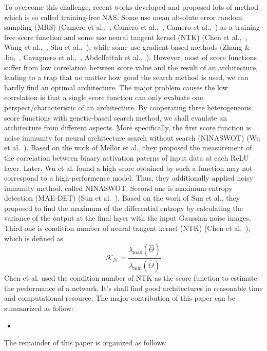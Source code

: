\documentclass[conference]{IEEEtran}
\begin{document}
    To overcome this challenge, recent works developed and proposed lots 
    of method which is so called training-free NAS. Some use mean absolute 
    error random sampling (MRS) (Camero et al.,\ \cite{https://doi.org/10.48550/arxiv.1805.07159}, 
    Camero et al.,\ \cite{Camero_2021}, Camero et al.,\ \cite{https://doi.org/10.48550/arxiv.2106.15295}) 
    as a training-free score function and some use neural tangent kernel 
    (NTK) (Chen et al.,\ \cite{https://doi.org/10.48550/arxiv.2102.11535}, 
    Wang et al.,\ \cite{https://doi.org/10.48550/arxiv.2203.09137}, 
    Shu et al.,\ \cite{https://doi.org/10.48550/arxiv.2109.00817}), while some use 
    gradient-based methods (Zhang \& Jia,\ \cite{https://doi.org/10.48550/arxiv.2110.08616}, 
    Cavagnero et al.,\ \cite{https://doi.org/10.48550/arxiv.2207.05135}, 
    Abdelfattah et al.,\ \cite{https://doi.org/10.48550/arxiv.2101.08134}).
    However, most of score functions suffer from low correlation between 
    score value and the result of an architecture, leading to a trap that 
    no matter how good the search method is used, we can hardly find an 
    optimal architecture.
    The major problem causes the low correlation is that a single score 
    function can only evaluate one perspect/characteristic of an architecture.
    By cooperating three heterogeneous score functions with genetic-based 
    search method, we shall evaulate an architecture from different aspects. 
    More specifically, the first score function is noise immunity for neural 
    architecture search without search (NINASWOT) (Wu et al.\ \cite{10.1145/3491396.3506510}). 
    Based on the work of Mellor et al., they proposed the measurement of 
    the correlation between binary activation paterns of input data at each 
    ReLU layer. Later, Wu et al. found a high score obtained by such a 
    function may not correspond to a high-performence model. Thus, they 
    additionally applied noisy immunity method, called NINASWOT. Second one 
    is maximum-entropy detection (MAE-DET) (Sun et al.\ \cite{https://doi.org/10.48550/arxiv.2111.13336}). 
    Based on the work of Sun et al., they proposed to find the maximum of 
    the differential entropy by calculating the variance of the output at 
    the final layer with the input Gaussian noise images. Third one is 
    condition number of  neural tangent kernel (NTK) (Chen et al.\ \cite{https://doi.org/10.48550/arxiv.2102.11535}), 
    which is defined as 
    \begin{equation}
        \mathcal{K_N}=\frac{\lambda_{\textrm{max}}(\hat\Theta)}{\lambda_{\textrm{min}}(\hat\Theta)}
    \end{equation}
    Chen et al. used the condition number of NTK as the score function to estimate the performance of a network.
    It's shall find good architectures in reasonable time and computational resource.
    The major contribution of this paper can be summarized as follow:
    \begin{itemize}
        \item 
    \end{itemize}

    The remainder of this paper is organized as follows:

    
    
\end{document}
